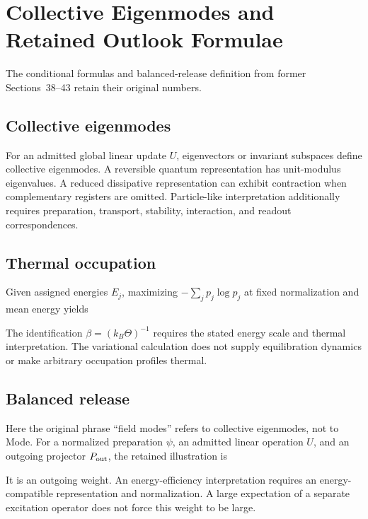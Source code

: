 \section{Collective Eigenmodes and Retained Outlook Formulae}\label{app:collective}
The conditional formulas and balanced-release definition from former Sections~38--43 retain their original numbers.

\subsection{Collective eigenmodes}\label{sec:modes}
For an admitted global linear update $U$, eigenvectors or invariant subspaces define collective eigenmodes. A reversible quantum representation has unit-modulus eigenvalues. A reduced dissipative representation can exhibit contraction when complementary registers are omitted. Particle-like interpretation additionally requires preparation, transport, stability, interaction, and readout correspondences.

\subsection{Thermal occupation}\label{sec:temperature}
Given assigned energies $E_j$, maximizing $-\sum_jp_j\log p_j$ at fixed normalization and mean energy yields

The identification $\beta=(k_B\Theta)^{-1}$ requires the stated energy scale and thermal interpretation. The variational calculation does not supply equilibration dynamics or make arbitrary occupation profiles thermal.

\subsection{Balanced release}\label{sec:release}
\begingroup\renewcommand{\thetheorem}{40.1}

\endgroup
Here the original phrase ``field modes'' refers to collective eigenmodes, not to Mode. For a normalized preparation $\psi$, an admitted linear operation $U$, and an outgoing projector $P_{\rm out}$, the retained illustration is

It is an outgoing weight. An energy-efficiency interpretation requires an energy-compatible representation and normalization. A large expectation of a separate excitation operator does not force this weight to be large.

